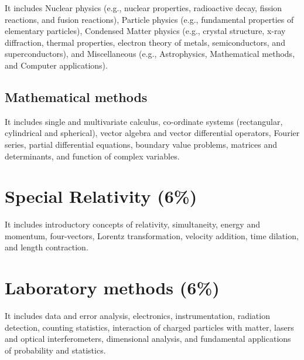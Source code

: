 \documentclass[12pt,a4paper]{article}
\begin{document}
It includes Nuclear physics (e.g., nuclear properties, radioactive decay, fission reactions, and fusion reactions), Particle physics (e.g., fundamental properties of elementary particles), Condensed Matter physics (e.g., crystal structure, x-ray diffraction, thermal properties, electron theory of metals, semiconductors, and superconductors), and Miscellaneous (e.g., Astrophysics, Mathematical methods, and Computer applications). 

\subsection{Mathematical methods}

It includes single and multivariate calculus, co-ordinate systems (rectangular, cylindrical and spherical), vector algebra and vector differential operators, Fourier series, partial differential equations, boundary value problems, matrices and determinants, and function of complex variables.


\section{Special Relativity (6\%)}

It includes introductory concepts of relativity, simultaneity, energy and momentum, four-vectors, Lorentz transformation, velocity addition, time dilation, and length contraction.

\section{Laboratory methods (6\%)}

It includes data and error analysis, electronics, instrumentation, radiation detection, counting statistics, interaction of charged particles with matter, lasers and optical interferometers, dimensional analysis, and fundamental applications of probability and statistics.
\end{document}
